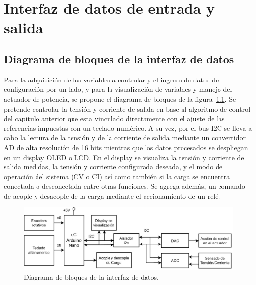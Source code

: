 \chapter{Interfaz de datos de entrada y salida}

\label{C:Interfaz de datos de entrada y salida}

\section{Diagrama de bloques de la interfaz de datos}
Para la adquisición de las variables a controlar y el ingreso de datos de configuración por un lado, y para la visualización de variables y manejo del actuador de potencia, se propone el diagrama de bloques de la figura~\ref{F:diagrama_digital}. Se pretende controlar la tensión y corriente de salida en base al algoritmo de control del capitulo anterior que esta vinculado directamente con el ajuste de las referencias impuestas con un teclado numérico. A su vez, por el bus I2C se lleva a cabo la lectura de la tensión y de la corriente de salida mediante un convertidor AD de alta resolución de 16 bits mientras que los datos procesados se despliegan en un display OLED o LCD. En el display se visualiza la tensión y corriente de salida medidas, la tensión y corriente configurada deseada, y el modo de operación del sistema (CV o CI) así como también si la carga se encuentra conectada o desconectada entre otras funciones. Se agrega además, un comando de acople y desacople de la carga mediante el accionamiento de un relé.\par 

\begin{figure} [H]
    \centering
    \includegraphics[width=\textwidth]{./imagenes/diagrama_digital.jpg}
    \caption{Diagrama de bloques de la interfaz de datos.}
    \label{F:diagrama_digital}
\end{figure}\par 

